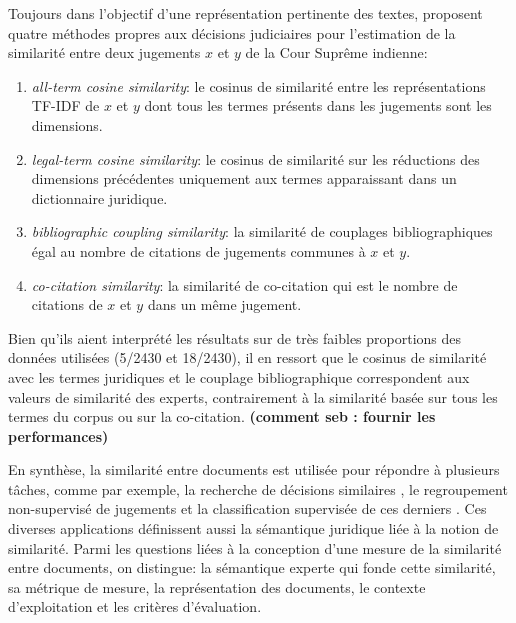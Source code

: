 Toujours dans l'objectif d'une représentation pertinente des textes, \citet{kumar2011judgmentsimilarity} proposent quatre méthodes propres aux décisions judiciaires pour l'estimation de la similarité entre deux jugements  $x$ et $y$ de la Cour Suprême indienne:
\begin{enumerate}
\item \textit{all-term cosine similarity}: le cosinus de similarité entre les représentations TF-IDF de $x$ et $y$ dont tous les termes présents dans les jugements sont les dimensions.
\item \textit{legal-term cosine similarity}: le cosinus de similarité sur les réductions des dimensions précédentes uniquement aux termes apparaissant dans un dictionnaire juridique.
\item  \textit{bibliographic coupling similarity}: la similarité de couplages bibliographiques égal au nombre de citations de jugements communes à $x$ et $y$.
\item \textit{co-citation similarity}: la similarité de co-citation qui est le nombre de citations de $x$ et $y$ dans un même jugement. 
\end{enumerate}

 Bien qu'ils aient interprété les résultats sur de très faibles proportions des données utilisées (5/2430 et 18/2430), il en ressort que le cosinus de similarité avec les termes juridiques et le couplage bibliographique correspondent aux valeurs de similarité des experts, contrairement à la similarité basée sur tous les termes du corpus ou sur la co-citation. 
 \textbf{(comment seb : fournir les performances)}

En synthèse, la similarité entre documents est utilisée pour répondre à plusieurs tâches, comme par exemple, la recherche de décisions similaires \citep{thenmozhi2017legalprecedretriev}, le regroupement non-supervisé de jugements \citep{raghuveer2012legalclusteringLDA} et la classification supervisée de ces derniers \citep{ma2018wmdchinesecase}. Ces diverses applications définissent aussi la sémantique juridique liée à la notion de similarité. Parmi les questions liées à la conception d'une mesure de la similarité entre documents, on distingue: la sémantique experte qui fonde cette similarité, sa métrique de mesure, la représentation des documents, le contexte d'exploitation et les critères d'évaluation. %

